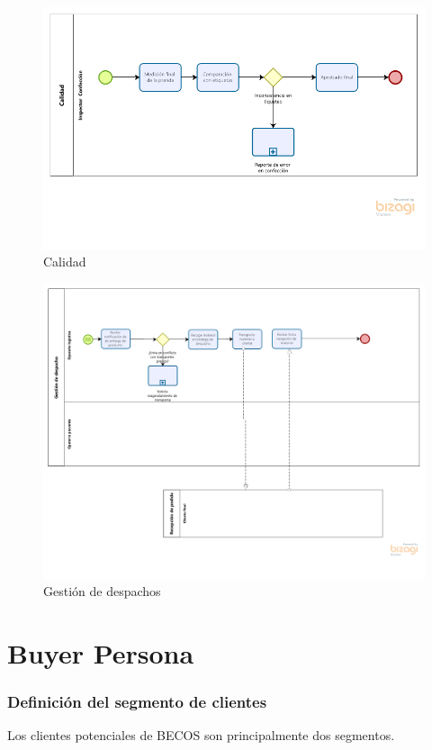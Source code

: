 \documentclass[11pt]{article}
\begin{document}
\begin{figure}[H]
\centering
\includegraphics[width=.9\linewidth]{./assets/build/calidad.png}
\caption{\label{fig:calidad} Calidad}
\end{figure}

\begin{figure}[H]
\centering
\includegraphics[width=.9\linewidth]{./assets/build/gestion_despacho.png}
\caption{\label{fig:gest_despacho}Gestión de despachos}
\end{figure}

\section{Buyer Persona}
\label{sec:org8fcde79}
\subsubsection{Definición del segmento de clientes}
\label{sec:org14c8273}
Los clientes potenciales de BECOS son principalmente
dos segmentos.
\end{document}
